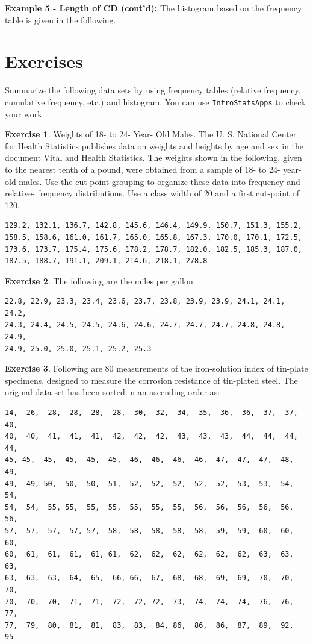 \documentclass[
]{book}
\begin{document}
\textbf{Example 5 - Length of CD (cont'd):} The histogram based on the frequency table is given in the following.

\hfill\break

\hypertarget{exercises}{%
\section{Exercises}\label{exercises}}

Summarize the following data sets by using frequency tables (relative frequency, cumulative frequency, etc.) and histogram. You can use \texttt{IntroStatsApps} to check your work.

\textbf{Exercise 1}. Weights of 18- to 24- Year- Old Males. The U. S. National Center for Health Statistics publishes data on weights and heights by age and sex in the document Vital and Health Statistics. The weights shown in the following, given to the nearest tenth of a pound, were obtained from a sample of 18- to 24- year- old males. Use the cut-point grouping to organize these data into frequency and relative- frequency distributions. Use a class width of 20 and a first cut-point of 120.

\begin{verbatim}
129.2, 132.1, 136.7, 142.8, 145.6, 146.4, 149.9, 150.7, 151.3, 155.2, 
158.5, 158.6, 161.0, 161.7, 165.0, 165.8, 167.3, 170.0, 170.1, 172.5, 
173.6, 173.7, 175.4, 175.6, 178.2, 178.7, 182.0, 182.5, 185.3, 187.0, 
187.5, 188.7, 191.1, 209.1, 214.6, 218.1, 278.8
\end{verbatim}

\textbf{Exercise 2}. The following are the miles per gallon.

\begin{verbatim}
22.8, 22.9, 23.3, 23.4, 23.6, 23.7, 23.8, 23.9, 23.9, 24.1, 24.1, 24.2, 
24.3, 24.4, 24.5, 24.5, 24.6, 24.6, 24.7, 24.7, 24.7, 24.8, 24.8, 24.9, 
24.9, 25.0, 25.0, 25.1, 25.2, 25.3
\end{verbatim}

\textbf{Exercise 3}. Following are 80 measurements of the iron-solution index of tin-plate specimens, designed to measure the corrosion resistance of tin-plated steel. The original data set has been sorted in an ascending order as:

\begin{verbatim}
14,  26,  28,  28,  28,  28,  30,  32,  34,  35,  36,  36,  37,  37,  40, 
40,  40,  41,  41,  41,  42,  42,  42,  43,  43,  43,  44,  44,  44,  44,  
45, 45,  45,  45,  45,  45,  46,  46,  46,  46,  47,  47,  47,  48,  49,  
49,  49, 50,  50,  50,  51,  52,  52,  52,  52,  52,  53,  53,  54,  54,  
54,  54,  55, 55,  55,  55,  55,  55,  55,  56,  56,  56,  56,  56,  56,  
57,  57,  57,  57, 57,  58,  58,  58,  58,  58,  59,  59,  60,  60,  60,  
60,  61,  61,  61,  61, 61,  62,  62,  62,  62,  62,  62,  63,  63,  63,  
63,  63,  63,  64,  65,  66, 66,  67,  68,  68,  69,  69,  70,  70,  70,  
70,  70,  70,  71,  71,  72,  72, 72,  73,  74,  74,  74,  76,  76,  77,  
77,  79,  80,  81,  81,  83,  83,  84, 86,  86,  86,  87,  89,  92,  95
\end{verbatim}
\end{document}
